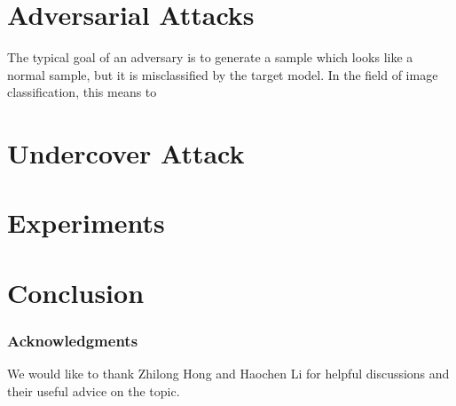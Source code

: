 \documentclass{article}
\begin{document}
\section{Adversarial Attacks}

The typical goal of an adversary is to generate a sample which looks like a normal sample, but it is misclassified by the target model. In the field of image classification, this means to 








\section{Undercover Attack}

\section{Experiments}


\section{Conclusion}














\subsubsection*{Acknowledgments}

We would like to thank Zhilong Hong and Haochen Li for helpful discussions and their useful advice on the topic. %

\small


\end{document}
